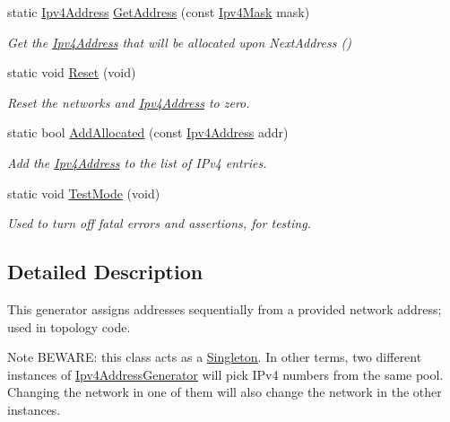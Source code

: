 \begin{DoxyCompactItemize}
static \hyperlink{classns3_1_1Ipv4Address}{Ipv4\+Address} \hyperlink{classns3_1_1Ipv4AddressGenerator_afaca8ee1dee4a55d3858a0958295da5a}{Get\+Address} (const \hyperlink{classns3_1_1Ipv4Mask}{Ipv4\+Mask} mask)
\begin{DoxyCompactList}\small\item\em Get the \hyperlink{classns3_1_1Ipv4Address}{Ipv4\+Address} that will be allocated upon Next\+Address () \end{DoxyCompactList}\item 
static void \hyperlink{classns3_1_1Ipv4AddressGenerator_acd4dd3b92227ade30c187a986122c60a}{Reset} (void)
\begin{DoxyCompactList}\small\item\em Reset the networks and \hyperlink{classns3_1_1Ipv4Address}{Ipv4\+Address} to zero. \end{DoxyCompactList}\item 
static bool \hyperlink{classns3_1_1Ipv4AddressGenerator_aaf2a4f76afaf064183151f874019e2d6}{Add\+Allocated} (const \hyperlink{classns3_1_1Ipv4Address}{Ipv4\+Address} addr)
\begin{DoxyCompactList}\small\item\em Add the \hyperlink{classns3_1_1Ipv4Address}{Ipv4\+Address} to the list of I\+Pv4 entries. \end{DoxyCompactList}\item 
static void \hyperlink{classns3_1_1Ipv4AddressGenerator_a43b5d4e88916898ac853f7a321b7cb4c}{Test\+Mode} (void)
\begin{DoxyCompactList}\small\item\em Used to turn off fatal errors and assertions, for testing. \end{DoxyCompactList}\end{DoxyCompactItemize}


\subsection{Detailed Description}
This generator assigns addresses sequentially from a provided network address; used in topology code. 

\begin{DoxyNote}{Note}
B\+E\+W\+A\+RE\+: this class acts as a \hyperlink{classns3_1_1Singleton}{Singleton}. In other terms, two different instances of \hyperlink{classns3_1_1Ipv4AddressGenerator}{Ipv4\+Address\+Generator} will pick I\+Pv4 numbers from the same pool. Changing the network in one of them will also change the network in the other instances. 
\end{DoxyNote}


